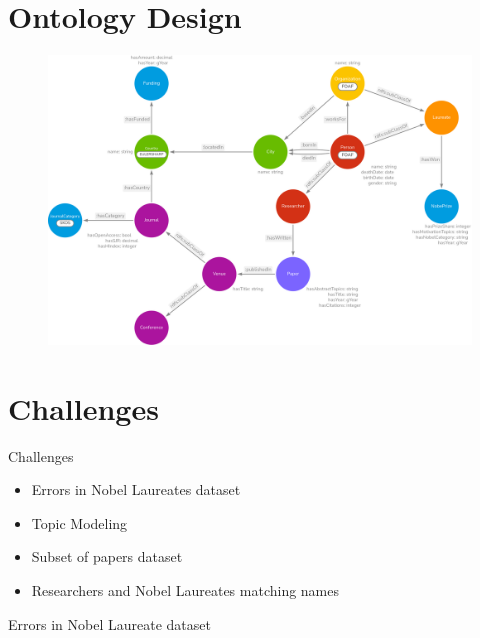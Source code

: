 \documentclass[aspectratio=169,xcolor=dvipsnames]{beamer}
\begin{document}
\section{Ontology Design}

\begin{frame}
	\begin{figure}
		\includegraphics[width=0.75\linewidth]{../nobelOntologyTransparent.png}
	\end{figure}
\end{frame}

\section{Challenges}

\begin{frame}{Challenges}
	\begin{itemize}
		\item Errors in Nobel Laureates dataset
		      \vspace{1em}
		\item Topic Modeling
		      \vspace{1em}
		\item Subset of papers dataset
		      \vspace{1em}
		\item Researchers and Nobel Laureates matching names
	\end{itemize}
\end{frame}

\begin{frame}{Errors in Nobel Laureate dataset}
	\begin{table}[H]
		\centering
		\caption{Example of dataset error}
		\label{tab:datasetError}
	\end{table}
\end{frame}
\end{document}
